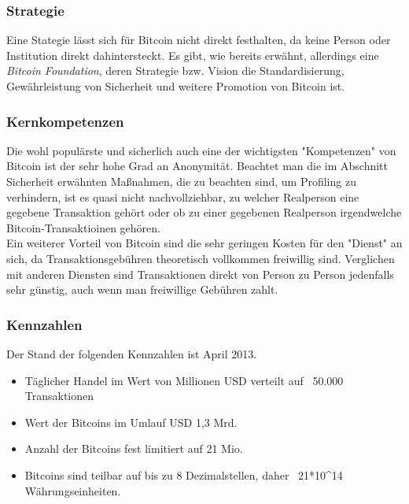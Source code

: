 \subsubsection{Strategie}
Eine Stategie lässt sich für Bitcoin nicht direkt festhalten, da keine Person oder Institution direkt dahintersteckt. Es gibt, wie bereits erwähnt, allerdings eine \emph{Bitcoin Foundation}, deren Strategie bzw. Vision die Standardisierung, Gewährleistung von Sicherheit und weitere Promotion von Bitcoin ist.

\subsubsection{Kernkompetenzen}
Die wohl populärste und sicherlich auch eine der wichtigsten "Kompetenzen" von Bitcoin ist der sehr hohe Grad an Anonymität. Beachtet man die im Abschnitt Sicherheit erwähnten Maßnahmen, die zu beachten sind, um Profiling zu verhindern, ist es quasi nicht nachvollziehbar, zu welcher Realperson eine gegebene Transaktion gehört oder ob zu einer gegebenen Realperson irgendwelche Bitcoin-Transaktioinen gehören.\\
Ein weiterer Vorteil von Bitcoin sind die sehr geringen Kosten für den "Dienst" an sich, da Transaktionsgebühren theoretisch vollkommen freiwillig sind. Verglichen mit anderen Diensten sind Transaktionen direkt von Person zu Person jedenfalls sehr günstig, auch wenn man freiwillige Gebühren zahlt.

\subsubsection{Kennzahlen}
Der Stand der folgenden Kennzahlen ist April 2013.
\begin{itemize}
	\item Täglicher Handel im Wert von Millionen USD verteilt auf ~50.000 Transaktionen
	\item Wert der Bitcoins im Umlauf USD 1,3 Mrd.
	\item Anzahl der Bitcoins fest limitiert auf 21 Mio.
	\item Bitcoins sind teilbar auf bis zu 8 Dezimalstellen, daher ~21*10\textasciicircum 14 Währungseinheiten.
\end{itemize}
